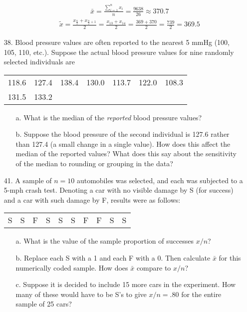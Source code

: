 \documentclass[letterpaper,12pt]{article}
\begin{document}
\begin{enumerate}
\begin{enumerate}
\begin{align*}
          \bar{x} = \frac{\sum_{i=1}^{n} x_{i}}{n} = \frac{9638}{26} \approx 370.7
        \end{align*}
        \begin{align*}
          \tilde{x} = \frac{x_{\frac{n}{2}} + x_{\frac{n}{2} + 1}}{2} = \frac{x_{13} + x_{14}}{2} = \frac{369 + 370}{2} = \frac{739}{2} = 369.5
        \end{align*}
    \end{enumerate}
  \item[38.]
    Blood pressure values are often reported to the nearest 5 mmHg (100, 105, 110, etc.). Suppose the actual blood pressure values for nine randomly selected individuals are
    \begin{center}
      \begin{tabular}{ccccccc}
        118.6 & 127.4 & 138.4 & 130.0 & 113.7 & 122.0 & 108.3 \\
        131.5 & 133.2
      \end{tabular}
    \end{center}
    \begin{enumerate}
      \item[a.]
        What is the median of the \textit{reported} blood pressure values?
      \item[b.]
        Suppose the blood pressure of the second individual is 127.6 rather than 127.4 (a small change in a single value). How does this affect the median of the reported values? What does this say about the sensitivity of the median to rounding or grouping in the data?
    \end{enumerate}
  \item[41.]
    A sample of $n = 10$ automobiles was selected, and each was subjected to a 5-mph crash test. Denoting a car with no visible damage by S (for success) and a car with such damage by F, results were as follows:
    \begin{center}
      \begin{tabular}{cccccccccc}
        S & S & F & S & S & S & F & F & S & S
      \end{tabular}
    \end{center}
    \begin{enumerate}
      \item[a.]
        What is the value of the sample proportion of successes $x/n$?
      \item[b.]
        Replace each S with a 1 and each F with a 0. Then calculate $\bar{x}$ for this numerically coded sample. How does $\bar{x}$ compare to $x/n$?
      \item[c.]
        Suppose it is decided to include 15 more cars in the experiment. How many of these would have to be S's to give $x/n = .80$ for the entire sample of 25 cars?
    \end{enumerate}
\end{enumerate}
\end{document}
